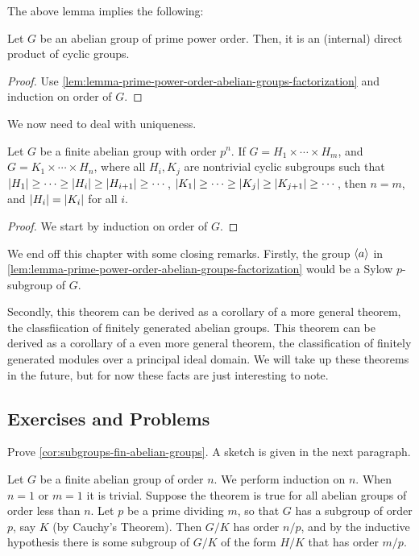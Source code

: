 \documentclass[./main.tex]{subfiles}
\begin{document}
The above lemma implies the following:
\begin{lemma}
    Let $G$ be an abelian group of prime power order. Then, it is an (internal)
    direct product of cyclic groups.
\end{lemma}
\begin{proof}
    Use \cref{lem:lemma-prime-power-order-abelian-groups-factorization} and
    induction on order of $G$.
\end{proof}

We now need to deal with uniqueness.

\begin{lemma}
    Let $G$ be a finite abelian group with order $p^n$. If $G = H_1 \times
    \cdots \times H_m$, and $G = K_1 \times \cdots \times H_n$, where all $H_i,
    K_j$ are nontrivial cyclic subgroups such that $\abs{H_1} \geq \cdots \geq
    \abs{H_i} \geq \abs{H_{i+1}} \geq \cdots$, $\abs{K_1} \geq \cdots \geq
    \abs{K_j} \geq \abs{K_{j+1}} \geq \cdots$, then $n = m$, and $\abs{H_i} =
    \abs{K_i}$ for all $i$.
\end{lemma}
\begin{proof}
    We start by induction on order of $G$. 
\end{proof}


We end off this chapter with some closing remarks. Firstly, the group ${ \langle a \rangle }$
in \cref{lem:lemma-prime-power-order-abelian-groups-factorization} would be a
Sylow $p$-subgroup of $G$.

Secondly, this theorem can be derived as a corollary of a more general theorem,
the classfiication of finitely generated abelian groups. This theorem can be
derived as a corollary of a even more general theorem, the classification of
finitely generated modules over a principal ideal domain. We will take up these
theorems in the future, but for now these facts are just interesting to note.


\subsection{Exercises and Problems}

\begin{exercise}
\label{ex:subgroups-fin-abelian-groups}
Prove \cref{cor:subgroups-fin-abelian-groups}. A sketch is given in the next paragraph.

Let $G$ be a finite abelian group of order $n$. We perform induction on $n$.
When $n=1$ or $m=1$ it is trivial. Suppose the theorem is true for all abelian
groups of order less than $n$. Let $p$ be a prime dividing $m$, so that $G$ has
a subgroup of order $p$, say $K$ (by Cauchy's Theorem). Then $G/K$ has order
$n/p$, and by the inductive hypothesis there is some subgroup of $G/K$ of the
form $H/K$ that has order $m/p$.
\end{exercise}
\end{document}
